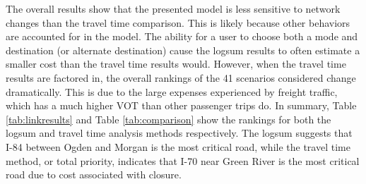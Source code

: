 The overall results show that the presented model is less sensitive to
network changes than the travel time comparison. This is likely because
other behaviors are accounted for in the model. The ability for a user to
choose both a mode and destination (or alternate destination) cause the
logsum results to often estimate a smaller cost than the travel time
results would. However, when the travel time results are factored in, the
overall rankings of the 41 scenarios considered change dramatically. This
is due to the large expenses experienced by freight traffic, which has a
much higher VOT than other passenger trips do. In summary, Table
\ref{tab:linkresults} and Table \ref{tab:comparison} show the rankings
for both the logsum and travel time analysis methods respectively. The
logsum suggests that I-84 between Ogden and Morgan is the most critical
road, while the travel time method, or total priority, indicates that I-70
near Green River is the most critical road due to cost associated with
closure.

